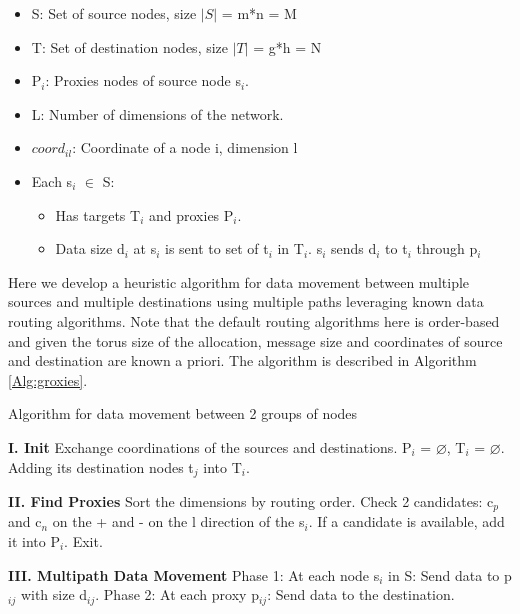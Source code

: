 \documentclass[final,5p,times]{elsarticle}
\begin{document}
\begin{itemize}
\item S: Set of source nodes, size $|S|$ = m*n = M
\item T: Set of destination nodes, size $|T|$ = g*h = N
\item P$_i$: Proxies nodes of source node s$_i$.
\item L: Number of dimensions of the network.
\item $coord_{il}$: Coordinate of a node i, dimension l
\item Each s$_i$ $\in$ S:
\begin{itemize}
\item Has targets T$_i$ and proxies P$_i$.
\item Data size d$_i$ at s$_i$ is sent to set of t$_i$ in T$_i$. s$_i$ sends d$_{i}$ to t$_i$ through p$_i$

\end{itemize}
\end{itemize}

Here we develop a heuristic algorithm for data movement between multiple sources and multiple destinations using multiple paths leveraging known  data routing algorithms. Note that the default routing algorithms here is order-based and given the torus size of the allocation, message size and coordinates of source and destination are known a priori. The algorithm is described in Algorithm \ref{Alg:groxies}.

\begin{algorithm}
\caption{Algorithm for data movement between 2 groups of nodes}
\begin{algorithmic}

\STATE \textbf{I. Init}
\STATE Exchange coordinations of the sources and destinations.
\STATE P$_i$ = $\varnothing$, T$_i$ = $\varnothing$.
\STATE Adding its destination nodes t$_j$ into T$_i$.
\ENDFOR

\STATE \textbf{II. Find Proxies}
\STATE Sort the dimensions by routing order.
\STATE Check 2 candidates: c$_p$ and c$_n$ on the + and - on the l direction of the s$_i$. %
\STATE If a candidate is available, add it into P$_i$.
\ENDFOR
\ENDFOR
{} \STATE Exit. \ENDIF
\ENDFOR

\STATE \textbf{III. Multipath Data Movement}
\STATE Phase 1: At each node s$_i$ in S:
\STATE Send data to p$_{ij}$ with size d$_{ij}$.
\ENDFOR
\STATE Phase 2: At each proxy p$_{ij}$:
\STATE Send data to the destination.
\end{algorithmic}
\label{Alg:groxies}
\end{algorithm}
\end{document}
